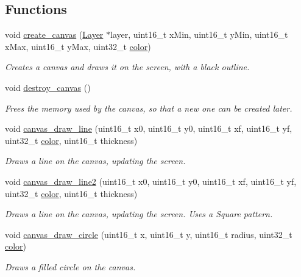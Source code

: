 \subsection*{Functions}
\begin{DoxyCompactItemize}
\item 
void \mbox{\hyperlink{group__canvas_ga8ca57c812327763152c635d235e3104e}{create\+\_\+canvas}} (\mbox{\hyperlink{struct_layer}{Layer}} $\ast$layer, uint16\+\_\+t x\+Min, uint16\+\_\+t y\+Min, uint16\+\_\+t x\+Max, uint16\+\_\+t y\+Max, uint32\+\_\+t \mbox{\hyperlink{structcolor}{color}})
\begin{DoxyCompactList}\small\item\em Creates a canvas and draws it on the screen, with a black outline. \end{DoxyCompactList}\item 
void \mbox{\hyperlink{group__canvas_ga1574bd14271b62f79a866c5b961ea41a}{destroy\+\_\+canvas}} ()
\begin{DoxyCompactList}\small\item\em Frees the memory used by the canvas, so that a new one can be created later. \end{DoxyCompactList}\item 
void \mbox{\hyperlink{group__canvas_ga6467ff4e7b1752b7d5e59664a16d3319}{canvas\+\_\+draw\+\_\+line}} (uint16\+\_\+t x0, uint16\+\_\+t y0, uint16\+\_\+t xf, uint16\+\_\+t yf, uint32\+\_\+t \mbox{\hyperlink{structcolor}{color}}, uint16\+\_\+t thickness)
\begin{DoxyCompactList}\small\item\em Draws a line on the canvas, updating the screen. \end{DoxyCompactList}\item 
void \mbox{\hyperlink{group__canvas_ga6cdeb1a3e72205082d77d0fb9b61b22f}{canvas\+\_\+draw\+\_\+line2}} (uint16\+\_\+t x0, uint16\+\_\+t y0, uint16\+\_\+t xf, uint16\+\_\+t yf, uint32\+\_\+t \mbox{\hyperlink{structcolor}{color}}, uint16\+\_\+t thickness)
\begin{DoxyCompactList}\small\item\em Draws a line on the canvas, updating the screen. Uses a Square pattern. \end{DoxyCompactList}\item 
void \mbox{\hyperlink{group__canvas_gabd95ad76b8189badc5d0e84de1bb8987}{canvas\+\_\+draw\+\_\+circle}} (uint16\+\_\+t x, uint16\+\_\+t y, uint16\+\_\+t radius, uint32\+\_\+t \mbox{\hyperlink{structcolor}{color}})
\begin{DoxyCompactList}\small\item\em Draws a filled circle on the canvas. \end{DoxyCompactList}\item 

\end{DoxyCompactItemize}
